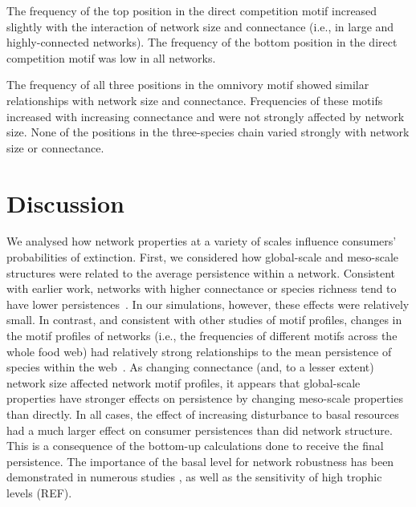 \documentclass[12pt]{article}
\begin{document}
\begin{spacing}{2.0}
            
            The frequency of the top position in the direct competition motif increased slightly with the interaction of network size and connectance (i.e., in large and highly-connected networks).
            The frequency of the bottom position in the direct competition motif was low in all networks.
            
            
            The frequency of all three positions in the omnivory motif showed similar relationships with network size and connectance.
            Frequencies of these motifs increased with increasing connectance and were not strongly affected by network size.
            None of the positions in the three-species chain varied strongly with network size or connectance.
            

\section*{Discussion}


We analysed how network properties at a variety of scales influence consumers' probabilities of extinction.
First, we considered how global-scale and meso-scale structures were related to the average persistence within a network.
Consistent with earlier work, networks with higher connectance or species richness tend to have lower persistences~\citep{}.
In our simulations, however, these effects were relatively small.
In contrast, and consistent with other studies of motif profiles, changes in the motif profiles of networks (i.e., the frequencies of different motifs across the whole food web) had relatively strong relationships to the mean persistence of species within the web~\citep{prill2005dynamic, bascompte2005simple}.
As changing connectance (and, to a lesser extent) network size 
affected network motif profiles, it appears that global-scale properties have stronger effects on persistence by changing meso-scale properties than directly.
In all cases, the effect of increasing disturbance to basal resources had a much larger effect on consumer persistences than did network structure.
This is a consequence of the bottom-up calculations done to receive the final persistence. The importance of the basal level for network robustness has been demonstrated in numerous studies \citep{scherber2010bottom}, as well as the sensitivity of high trophic levels (REF).



\end{spacing}
\end{document}
